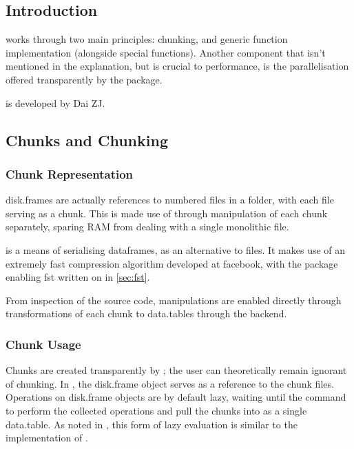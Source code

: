 \subsection{Introduction}\label{sec:disk-frame-introduction}

 works through two main principles: chunking, and generic
function implementation (alongside special functions). Another component
that isn't mentioned in the explanation, but is crucial to performance,
is the parallelisation offered transparently by the package.

 is developed by Dai ZJ.

\subsection{Chunks and Chunking}\label{sec:chunking}

\subsubsection{Chunk Representation}\label{sec:chunk-representation}

disk.frames are actually references to numbered  files in a
folder, with each file serving as a chunk. This is made use of through
manipulation of each chunk separately, sparing RAM from dealing with a
single monolithic file\cite{zj19:_inges_data}.

 is a means of serialising dataframes, as an alternative to 
files\cite{klik19}. It makes use of an extremely fast compression
algorithm developed at facebook, with the \R{} package enabling fst written on in \cref{sec:fst}.

From inspection of the source code,  manipulations are enabled
directly through transformations of each chunk to data.tables through
the  backend.

\subsubsection{Chunk Usage}\label{sec:making-chunks}

Chunks are created transparently by ; the user can
theoretically remain ignorant of chunking. In \R{}, the disk.frame object
serves as a reference to the chunk files. Operations on disk.frame
objects are by default lazy, waiting until the
 command to perform the
collected operations and pull the chunks into \R{} as a single data.table.
As noted in \cite{zj19:_simpl_verbs_lazy_evaluat}, this form of lazy
evaluation is similar to the implementation of .

